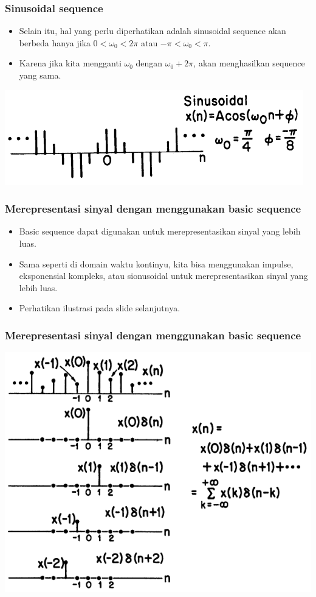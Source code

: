 \documentclass[pdflatex,compress]{beamer}
\begin{document}
\begin{frame}
	\frametitle{Sinusoidal sequence}
		\begin{itemize}
		\item Selain itu, hal yang perlu diperhatikan adalah sinusoidal sequence akan berbeda hanya jika $0 < \omega_0 < 2\pi $ atau $ -\pi < \omega_0 < \pi $.
		\item Karena jika kita mengganti $ \omega_0 $ dengan $ \omega_0 + 2\pi $, akan menghasilkan sequence yang sama.
	\end{itemize}
	\begin{center}
		\includegraphics[width=0.8\linewidth]{img/img010}
	\end{center}
\end{frame}

\begin{frame}
	\frametitle{Merepresentasi sinyal dengan menggunakan basic sequence}
	\begin{itemize}
		\item Basic sequence dapat digunakan untuk merepresentasikan sinyal yang lebih luas.
		\item Sama seperti di domain waktu kontinyu, kita bisa menggunakan impulse, eksponensial kompleks, atau sionusoidal untuk merepresentasikan sinyal yang lebih luas.
		\item Perhatikan ilustrasi pada slide selanjutnya.
	\end{itemize}
\end{frame}

\begin{frame}
	\frametitle{Merepresentasi sinyal dengan menggunakan basic sequence}
	\begin{center}
		\includegraphics[width=0.8\linewidth]{img/img012}
	\end{center}
\end{frame}
\end{document}
